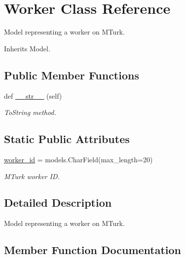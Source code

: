 \hypertarget{classjoinapp_1_1models_1_1task__management__models_1_1_worker}{}\section{Worker Class Reference}
\label{classjoinapp_1_1models_1_1task__management__models_1_1_worker}


Model representing a worker on M\+Turk.  




Inherits Model.

\subsection*{Public Member Functions}
\begin{DoxyCompactItemize}
\item 
def \mbox{\hyperlink{classjoinapp_1_1models_1_1task__management__models_1_1_worker_a23e8041ce1015febe4fdace3225714f9}{\+\_\+\+\_\+str\+\_\+\+\_\+}} (self)
\begin{DoxyCompactList}\small\item\em To\+String method. \end{DoxyCompactList}\end{DoxyCompactItemize}
\subsection*{Static Public Attributes}
\begin{DoxyCompactItemize}
\item 
\mbox{\hyperlink{classjoinapp_1_1models_1_1task__management__models_1_1_worker_adaca9ae6354c32a7ed391518a2299f0f}{worker\+\_\+id}} = models.\+Char\+Field(max\+\_\+length=20)
\begin{DoxyCompactList}\small\item\em M\+Turk worker ID. \end{DoxyCompactList}\end{DoxyCompactItemize}


\subsection{Detailed Description}
Model representing a worker on M\+Turk. 

\subsection{Member Function Documentation}
\mbox{\label{classjoinapp_1_1models_1_1task__management__models_1_1_worker_a23e8041ce1015febe4fdace3225714f9}} 
